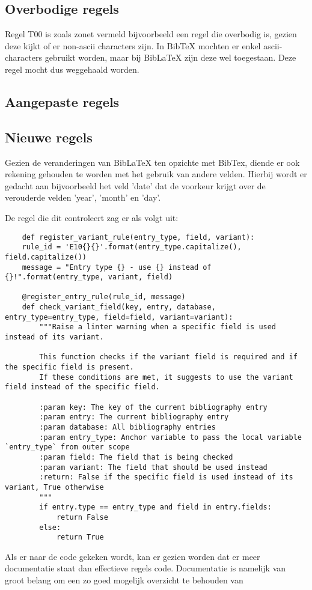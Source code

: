 \subsection{Overbodige regels}
Regel T00 is zoals zonet vermeld bijvoorbeeld een regel die overbodig is, gezien deze kijkt of er non-ascii characters zijn. In BibTeX mochten er enkel ascii-characters gebruikt worden, maar bij BibLaTeX zijn deze wel toegestaan. Deze regel mocht dus weggehaald worden.


\subsection{Aangepaste regels}

\subsection{Nieuwe regels}
Gezien de veranderingen van BibLaTeX ten opzichte met BibTex, diende er ook rekening gehouden te worden met het gebruik van andere velden. Hierbij wordt er gedacht aan bijvoorbeeld het veld 'date' dat de voorkeur krijgt over de verouderde velden 'year', 'month' en 'day'.

De regel die dit controleert zag er als volgt uit:
\begin{verbatim}
    def register_variant_rule(entry_type, field, variant):
    rule_id = 'E10{}{}'.format(entry_type.capitalize(), field.capitalize())
    message = "Entry type {} - use {} instead of {}!".format(entry_type, variant, field)

    @register_entry_rule(rule_id, message)
    def check_variant_field(key, entry, database, entry_type=entry_type, field=field, variant=variant):
        """Raise a linter warning when a specific field is used instead of its variant.

        This function checks if the variant field is required and if the specific field is present.
        If these conditions are met, it suggests to use the variant field instead of the specific field.

        :param key: The key of the current bibliography entry
        :param entry: The current bibliography entry
        :param database: All bibliography entries
        :param entry_type: Anchor variable to pass the local variable `entry_type` from outer scope
        :param field: The field that is being checked
        :param variant: The field that should be used instead
        :return: False if the specific field is used instead of its variant, True otherwise
        """
        if entry.type == entry_type and field in entry.fields:
            return False
        else:
            return True
\end{verbatim}
Als er naar de code gekeken wordt, kan er gezien worden dat er meer documentatie staat dan effectieve regels code. Documentatie is namelijk van groot belang om een zo goed mogelijk overzicht te behouden van 

